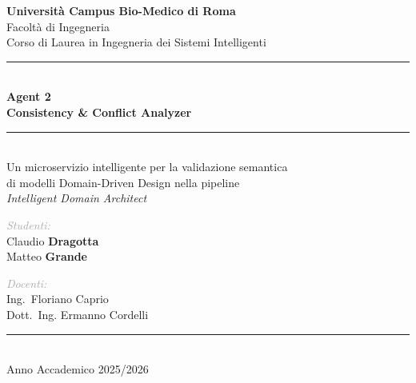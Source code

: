 \documentclass[12pt,a4paper]{report}
\begin{document}
\begin{titlepage}

  \centering
  \vspace*{0.8cm}
  {\large\textbf{\textcolor{agentblue}{Università Campus Bio-Medico di Roma}}\\[4pt]}
  {\normalsize Facoltà di Ingegneria\\[2pt]}
  {\normalsize Corso di Laurea in Ingegneria dei Sistemi Intelligenti\\}
\vspace{3cm}
  {\color{rulecolor}\rule{0.6\textwidth}{1.5pt}}\\[0.8cm]
  {\Huge\textbf{\textcolor{agentblue}{Agent 2}}}\\[0.5cm]
  {\LARGE\textbf{\textcolor{agentdark}{Consistency \& Conflict Analyzer}}}\\[0.5cm]
  {\color{rulecolor}\rule{0.6\textwidth}{1.5pt}}\\[1cm]
  {\large Un microservizio intelligente per la validazione semantica\\
  di modelli Domain-Driven Design nella pipeline\\
  \textit{Intelligent Domain Architect}}

  \vfill

  \begin{minipage}[t]{0.45\textwidth}
    {\small\textcolor{darkgray}{\textit{Studenti:}}}\\[4pt]
    Claudio \textbf{Dragotta}\\
    Matteo \textbf{Grande}
  \end{minipage}
  \hfill
  \begin{minipage}[t]{0.45\textwidth}
    \raggedleft
    {\small\textcolor{darkgray}{\textit{Docenti:}}}\\[4pt]
    Ing.\ Floriano Caprio \\
    Dott.\ Ing. Ermanno Cordelli
  \end{minipage}

  \vspace{1.5cm}
  {\color{rulecolor}\rule{0.4\textwidth}{0.8pt}}\\[6pt]
  {\normalsize Anno Accademico 2025/2026}
\end{titlepage}
\end{document}
